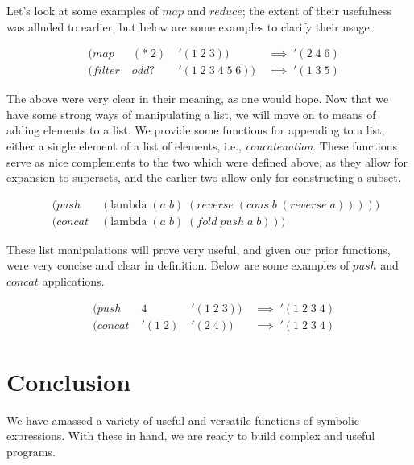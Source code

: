 Let's look at some examples of $map$ and $reduce$; the extent of their usefulness 
was alluded to earlier, but below are some examples to clarify their usage.

\begin{figure}[ht]
\caption{}\label{scheme}
\begin{align*}
& (map \; &(* \; 2) \; &'(1 \; 2 \; 3)) \; &\implies \; '(2 \; 4 \; 6)
\\& (filter \; &odd? \; &'(1 \; 2 \; 3 \; 4 \; 5 \; 6)) \; &\implies \; '(1 \; 3 \; 5)
\end{align*}
\end{figure}

The above were very clear in their meaning, as one would hope. Now that we have 
some strong ways of manipulating a list, we will move on to means of adding 
elements to a list. We provide some functions for appending to a list, either a 
single element of a list of elements, i.e., \emph{concatenation}. These functions serve 
as nice complements to the two which were defined above, as they allow for 
expansion to supersets, and the earlier two allow only for constructing a subset.

\begin{figure}[ht]
\caption{}\label{scheme}
\begin{align*}
& (push \; &(\text{lambda} \; (a \; b) \; (reverse \; (cons \; b \; (reverse \; a)))))
\\& (concat \; &(\text{lambda} \; (a \; b) \; (fold \; push \; a \; b)))
\end{align*}
\end{figure}

These list manipulations will prove very useful, and given our prior functions, 
were very concise and clear in definition. Below are some examples of $push$ and 
$concat$ applications.

\begin{figure}[ht]
\caption{}\label{scheme}
\begin{align*}
& (push \; &4 \; &'(1 \; 2 \; 3)) \; &\implies \; '(1 \; 2 \; 3 \; 4)
\\& (concat \; &'(1 \; 2) \; &'(2 \; 4)) \; &\implies \; '(1 \; 2 \; 3 \; 4)
\end{align*}
\end{figure}

\section{Conclusion}
We have amassed a variety of useful and versatile functions of symbolic 
expressions. With these in hand, we are ready to build complex and useful 
programs.
